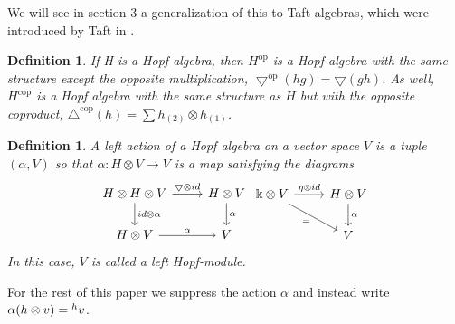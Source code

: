 \documentclass[12pt,a4paper]{article}
\newtheorem{definition}[theorem]{Definition}
\newcommand{\kk}{\Bbbk}
\newcommand\1{_{(1)}}
\newcommand\2{_{(2)}}
\begin{document}
We will see in section 3 a generalization of this to Taft algebras, which were introduced by Taft in \cite{T}.

\begin{definition}
If H is a Hopf algebra, then $H^\text{op}$ is a Hopf algebra with the same structure except the opposite multiplication, $\bigtriangledown^\text{op}(hg)=\bigtriangledown(gh)$.
As well, $H^\text{cop}$ is a Hopf algebra with the same structure as $H$ but with the opposite coproduct, $\triangle^\text{cop}(h)=\sum h\2\otimes h\1$.
\end{definition}

\begin{definition} A left action of a Hopf algebra on a vector space $V$ is a tuple $(\alpha, V)$ so that
$\alpha:H\otimes V\to V$ is a map satisfying the diagrams
\[
\begin{tikzcd}
H\otimes H\otimes V \arrow[r, "\bigtriangledown\otimes id"] \arrow[d, "id\otimes \alpha"] & H\otimes V \arrow[d, "\alpha"] \\
H\otimes V \arrow[r, "\alpha"]                                                         & V                             
\end{tikzcd}
\begin{tikzcd}
\kk\otimes V \arrow[r, "\eta\otimes id"] \arrow[rd, "="'] & H\otimes V \arrow[d, "\alpha"] \\
                                                          & V                             
\end{tikzcd}
\]
In this case, $V$ is called a left Hopf-module.
\end{definition}

For the rest of this paper we suppress the action $\alpha$ and instead write $\alpha(h\otimes v)=\prescript{h}{}v$.
\end{document}
